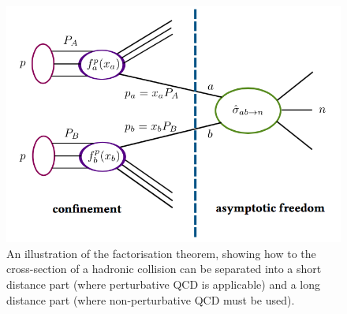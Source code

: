 \begin{figure}
\centering
\includegraphics[scale=0.5]{images/factorisation_theorem.png}
\caption{An illustration of the factorisation theorem, showing how to the cross-section of a hadronic collision can be separated into a short distance part (where perturbative QCD is applicable) and a long distance part (where non-perturbative QCD must be used). \cite{schnoor_thesis}}
\label{factorisation_theorem}
\end{figure}
